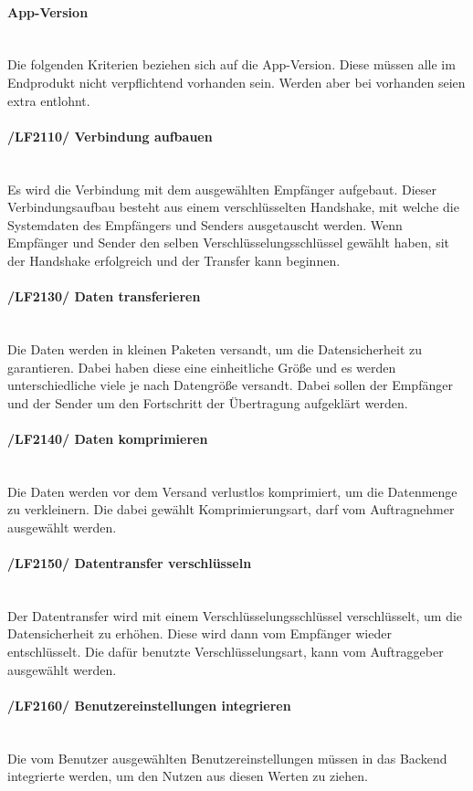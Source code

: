 \begin{indentE}
	\paragraph{App-Version}\mbox{}\\
	Die folgenden Kriterien beziehen sich auf die App-Version. Diese müssen alle im Endprodukt nicht verpflichtend vorhanden sein. Werden aber bei vorhanden seien extra entlohnt.
	\paragraph{/LF2110/ Verbindung aufbauen}\mbox{}\\
	Es wird die Verbindung mit dem ausgewählten Empfänger aufgebaut. Dieser Verbindungsaufbau besteht aus einem verschlüsselten Handshake, mit welche die Systemdaten des Empfängers und Senders ausgetauscht werden. Wenn Empfänger und Sender den selben Verschlüsselungsschlüssel gewählt haben, sit der Handshake erfolgreich und der Transfer kann beginnen.
	\paragraph{/LF2130/ Daten transferieren}\mbox{}\\
	Die Daten werden in kleinen Paketen versandt, um die Datensicherheit zu garantieren. Dabei haben diese eine einheitliche Größe und es werden unterschiedliche viele je nach Datengröße versandt. Dabei sollen der Empfänger und der Sender um den Fortschritt der Übertragung aufgeklärt werden.
	\paragraph{/LF2140/ Daten komprimieren}\mbox{}\\
	Die Daten werden vor dem Versand verlustlos komprimiert, um die Datenmenge zu verkleinern. Die dabei gewählt Komprimierungsart, darf vom Auftragnehmer ausgewählt werden.
	\paragraph{/LF2150/ Datentransfer verschlüsseln}\mbox{}\\
	Der Datentransfer wird mit einem Verschlüsselungsschlüssel verschlüsselt, um die Datensicherheit zu erhöhen. Diese wird dann vom Empfänger wieder entschlüsselt. Die dafür benutzte Verschlüsselungsart, kann vom Auftraggeber ausgewählt werden.
	\paragraph{/LF2160/ Benutzereinstellungen integrieren}\mbox{}\\
	Die vom Benutzer ausgewählten Benutzereinstellungen müssen in das Backend integrierte werden, um den Nutzen aus diesen Werten zu ziehen.

\end{indentE}
